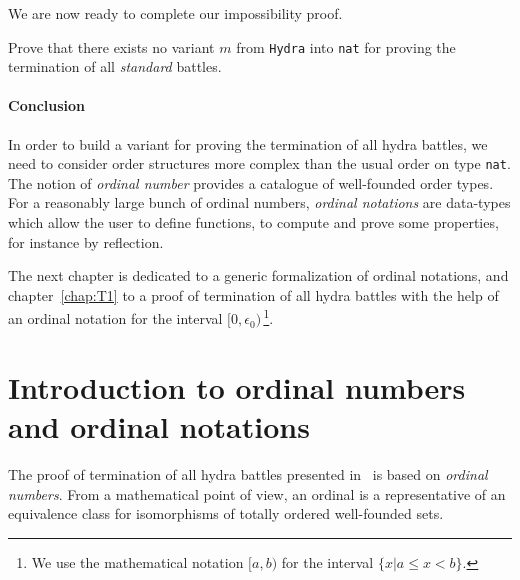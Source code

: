 We are now ready to complete our impossibility proof.

\vspace{4pt}

 



\begin{exercise}
Prove that there exists no variant $m$ from \texttt{Hydra} into \texttt{nat} for proving
    the  termination of all \emph{standard} battles.
\end{exercise}






\subsubsection{Conclusion}

In order to build a variant for proving the termination of all hydra battles, we need to consider order structures more complex than the usual order on type \texttt{nat}. 
The notion of \emph{ordinal number} provides a catalogue of well-founded order types.
For a reasonably large bunch of ordinal numbers, \emph{ordinal notations} are data-types which allow the \coq{} user to define functions, to compute and prove some properties, for instance by reflection.

The next chapter is dedicated to a generic formalization of ordinal notations, and chapter~\ref{chap:T1} to a proof of termination of all hydra battles with the help of an ordinal notation for the interval $[0,\epsilon_0)$\,\footnote{We use the mathematical notation $[a,b)$ for the interval $\{x|a\leq x < b\}$.}.
 

\chapter{Introduction to ordinal numbers and ordinal notations}
\label{chap:ON}

The proof of termination of all hydra battles presented in~\cite{KP82} is based
on \emph{ordinal numbers}.
From a mathematical point of view, an ordinal is a representative of an equivalence class for isomorphisms of  totally ordered well-founded sets.

